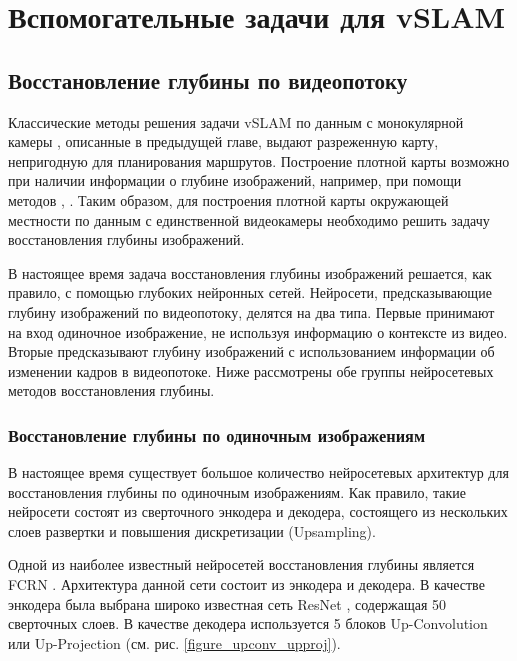 \documentclass{mipt-thesis-ms}
\begin{document}
	
	\chapter{Вспомогательные задачи для vSLAM}
	
	\section{Восстановление глубины по видеопотоку}
	
	Классические методы решения задачи vSLAM по данным с монокулярной камеры \cite{mur2015orb} \cite{engel2014lsd}, описанные в предыдущей главе, выдают разреженную карту, непригодную для планирования маршрутов. Построение плотной карты возможно при наличии информации о глубине изображений, например, при помощи методов \cite{labbe2011memory}, \cite{endres20133}. Таким образом, для построения плотной карты окружающей местности по данным с единственной видеокамеры необходимо решить задачу восстановления глубины изображений.
	
	В настоящее время задача восстановления глубины изображений решается, как правило, с помощью глубоких нейронных сетей. Нейросети, предсказывающие глубину изображений по видеопотоку, делятся на два типа. Первые принимают на вход одиночное изображение, не используя информацию о контексте из видео. Вторые предсказывают глубину изображений с использованием информации об изменении кадров в видеопотоке. Ниже рассмотрены обе группы нейросетевых методов восстановления глубины.
	
	\subsection{Восстановление глубины по одиночным изображениям}
	
	В настоящее время существует большое количество нейросетевых архитектур для восстановления глубины по одиночным изображениям. Как правило, такие нейросети состоят из сверточного энкодера и декодера, состоящего из нескольких слоев развертки и повышения дискретизации (Upsampling).
	
	Одной из наиболее известный нейросетей восстановления глубины является FCRN \cite{laina2016deeper}. Архитектура данной сети состоит из энкодера и декодера. В качестве энкодера была выбрана широко известная сеть ResNet \cite{he2016deep}, содержащая 50 сверточных слоев. В качестве декодера используется 5 блоков Up-Convolution или Up-Projection (см. рис. \ref{figure_upconv_upproj}).
	
\end{document}
